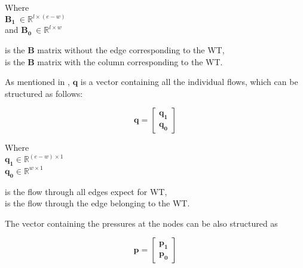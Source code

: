 \begin{minipage}[t]{0.24\textwidth}
Where\\
\hspace*{8mm} $\bm{B_1} \: \in \mathbb{R}^{l \times (e-w)}$  \\
and \hspace*{0.4mm} $\bm{B_0} \: \in \mathbb{R}^{l \times w} $ 
\end{minipage}
\begin{minipage}[t]{0.70\textwidth}
\vspace*{2mm}
\hspace*{4mm} is the $\bm{B}$ matrix without the edge corresponding to the WT,\\
\hspace*{4mm} is the $\bm{B}$ matrix with the column corresponding to the WT.
\end{minipage}

As mentioned in , $\bm{q}$ is a vector containing all the individual flows, which can be structured as follows:

\begin{equation}
\bm{q} =
\begin{bmatrix}
         \bm{q_1} \\
	\bm{q_0} 
\end{bmatrix}
\label{qmatrix}
\end{equation}

\begin{minipage}[t]{0.24\textwidth}
Where\\
\hspace*{8mm} $\bm{q_1} \in \mathbb{R}^{(e-w) \times 1}$  \\
\hspace*{8mm} $\bm{q_0} \in \mathbb{R}^{w \times 1} $ 
\end{minipage}
\begin{minipage}[t]{0.68\textwidth}
\vspace*{2mm}
\hspace*{4mm} is the flow through all edges expect for WT,\\
\hspace*{4mm} is the flow through the edge belonging to the WT. 
\end{minipage}

The vector containing the pressures at the nodes can be also structured as

\begin{equation}
\bm{p} =
\begin{bmatrix}
         \bm{p_1} \\
	\bm{p_0} 
\end{bmatrix}
\end{equation}

